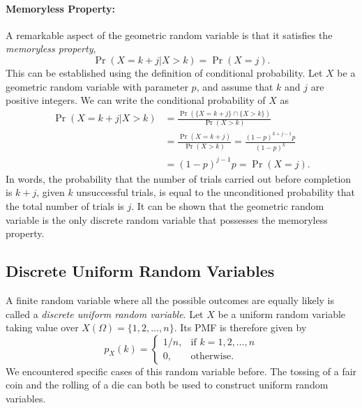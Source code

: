 \paragraph{Memoryless Property:}
A remarkable aspect of the geometric random variable is that it satisfies the \emph{memoryless property}, 
\begin{equation*}
\Pr (X = k + j | X > k) = \Pr (X = j).
\end{equation*}
This can be established using the definition of conditional probability.
Let $X$ be a geometric random variable with parameter $p$, and assume that $k$ and $j$ are positive integers.
We can write the conditional probability of $X$ as
\begin{equation*}
\begin{split}
\Pr (X = k + j | X > k)
&= \frac{\Pr( \{ X =  k + j \} \cap \{ X > k \} ) }{ \Pr ( X > k ) } \\
&= \frac{\Pr( X = k + j ) }{ \Pr ( X > k ) }
= \frac{(1 - p)^{k + j - 1} p }{ (1 - p)^k  } \\
&= (1 - p)^{j - 1} p
= \Pr (X = j).
\end{split}
\end{equation*}
In words, the probability that the number of trials carried out before completion is $k + j$, given $k$ unsuccessful trials, is equal to the unconditioned probability that the total number of trials is $j$.
It can be shown that the geometric random variable is the only discrete random variable that possesses the memoryless property.


\subsection{Discrete Uniform Random Variables}

A finite random variable where all the possible outcomes are equally likely is called a \emph{discrete uniform random variable}. 
Let $X$ be a uniform random variable taking value over $X (\Omega) = \{ 1, 2, \ldots, n \}$.
Its PMF is therefore given by
\begin{equation*}
p_X (k) = \left\{ \begin{array}{ll}
1/n, & \text{if }k = 1, 2, \ldots, n \\
0, & \text{otherwise} .
\end{array} \right.
\end{equation*}
We encountered specific cases of this random variable before.
The tossing of a fair coin and the rolling of a die can both be used to construct uniform random variables.

